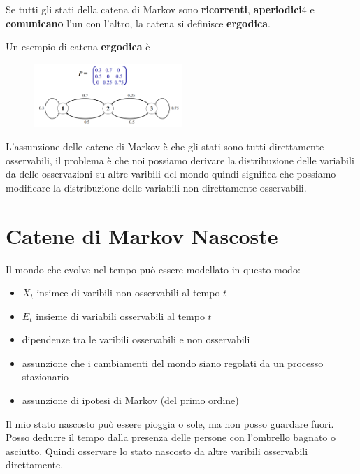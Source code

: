 \begin{definizione}
    Se tutti gli stati della catena di Markov sono \textbf{ricorrenti}, \textbf{aperiodici}4
    e \textbf{comunicano} l'un con l'altro, la catena si definisce \textbf{ergodica}.
\end{definizione}

\begin{esempio}
    Un esempio di catena \textbf{ergodica} è 
    \begin{figure}[!h]
        \centering
        \includegraphics*[width=0.5\textwidth]{img/catene/catena_ergodica.png}
    \end{figure}
\end{esempio}

L'assunzione delle catene di Markov è che gli stati sono tutti direttamente osservabili,
il problema è che noi possiamo derivare la distribuzione delle variabili da delle osservazioni 
su altre varibili del mondo quindi significa che possiamo modificare la distribuzione 
delle variabili non direttamente osservabili.

\section{Catene di Markov Nascoste}
Il mondo che evolve nel tempo può essere modellato in questo modo:
\begin{itemize}
    \item $X_t$ insimee di varibili non osservabili al tempo $t$
    \item $E_t$ insieme di variabili osservabili al tempo $t$
    \item dipendenze tra le varibili osservabili e non osservabili
    \item assunzione che i cambiamenti del mondo siano regolati da un processo stazionario 
    \item assunzione di ipotesi di Markov (del primo ordine)
\end{itemize}

\begin{esempio}
    Il mio stato nascosto può essere pioggia o sole, ma non posso guardare fuori. 
    Posso dedurre il tempo dalla presenza delle persone con l'ombrello bagnato o asciutto.
    Quindi osservare lo stato nascosto da altre varibili osservabili direttamente.
\end{esempio}

